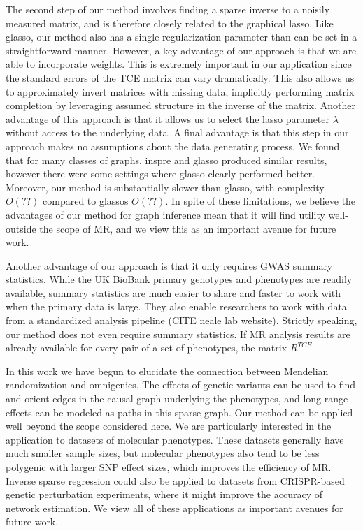\documentclass{article}
\begin{document}
The second step of our method involves finding a sparse inverse to a noisily measured
matrix, and is therefore closely related to the graphical lasso. Like glasso, our method
also has a single regularization parameter than can be set in a straightforward manner.
However, a key advantage of our approach is that we are able to incorporate
weights. This is extremely important in our application since the standard errors
of the TCE matrix can vary dramatically. This also allows us to approximately invert matrices
with missing data, implicitly performing matrix completion by leveraging assumed
structure in the inverse of the matrix. Another advantage
of this approach is that it allows us to select the lasso parameter $\lambda$ without
access to the underlying data. A final advantage is that this step in our approach makes no
assumptions about the data generating process. We found that for many classes of graphs,
inspre and glasso produced similar results, however there were some settings where glasso
clearly performed better. Moreover, our method is substantially slower than glasso, with
complexity $O(??)$ compared to glassos $O(??)$. In spite of these limitations,
we believe the advantages of our method for graph inference mean that it will find utility
well-outside the scope of MR, and we view this as an important avenue for future work.

Another advantage of our approach is that it only requires GWAS summary statistics.
While the UK BioBank primary genotypes and phenotypes are readily available, summary
statistics are much easier to share and faster to work with when the primary
data is large. They also enable researchers to work with data from a standardized
analysis pipeline (CITE neale lab website).
Strictly speaking, our method does not even require summary statistics. If
MR analysis results are already available for every pair of a set of phenotypes,
the matrix $R^{TCE}$ 

In this work we have begun to elucidate the connection between Mendelian randomization
and omnigenics. The effects of genetic variants can be used to find and orient edges
in the causal graph underlying the phenotypes, and long-range effects can be modeled
as paths in this sparse graph. Our method can be applied well beyond the scope considered
here. We are particularly interested in the application to datasets of molecular phenotypes.
These datasets generally have much smaller sample sizes, but molecular phenotypes also
tend to be less polygenic with larger SNP effect sizes, which improves the efficiency
of MR. Inverse sparse regression could also be applied to datasets from CRISPR-based
genetic perturbation experiments, where it might improve the accuracy of network estimation.
We view all of these applications as important avenues for future work.
\end{document}
